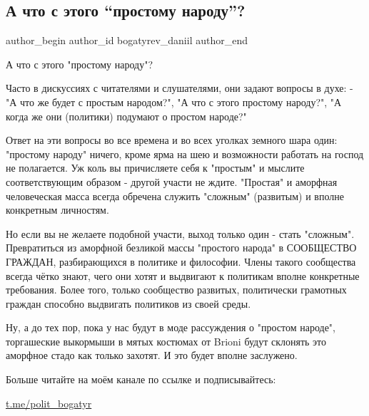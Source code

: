  
 
 
 
 
 
\subsection{А что с этого \enquote{простому народу}?}
\label{sec:22_10_2021.fb.bogatyrev_daniil.1.prostoj_narod}
 
\ifcmt
 author_begin
   author_id bogatyrev_daniil
 author_end
\fi

А что с этого "простому народу"?

Часто в дискуссиях с читателями и слушателями, они задают вопросы в духе: - "А
что же будет с простым народом?", "А что с этого простому народу?", "А когда же
они (политики) подумают о простом народе?"

Ответ на эти вопросы во все времена и во всех уголках земного шара один:
"простому народу" ничего, кроме ярма на шею и возможности работать на господ не
полагается. Уж коль вы причисляете себя к "простым" и мыслите соответствующим
образом - другой участи не ждите. "Простая" и аморфная человеческая масса
всегда обречена служить "сложным" (развитым) и вполне конкретным личностям.

Но если вы не желаете подобной участи, выход только один - стать "сложным".
Превратиться из аморфной безликой массы "простого народа" в СООБЩЕСТВО ГРАЖДАН,
разбирающихся в политике и философии. Члены такого сообщества всегда чётко
знают, чего они хотят и выдвигают к политикам вполне конкретные требования.
Более того, только сообщество развитых, политически грамотных граждан способно
выдвигать политиков из своей среды.

Ну, а до тех пор, пока у нас будут в моде рассуждения о "простом народе",
торгашеские выкормыши в мятых костюмах от Brioni будут склонять это аморфное
стадо как только захотят. И это будет вполне заслужено.

Больше читайте на моём канале по ссылке и подписывайтесь:

\url{t.me/polit_bogatyr}

